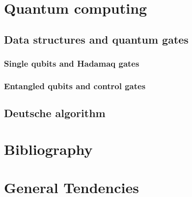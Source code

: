 \documentclass{book}
\begin{document}
\chapter{Quantum computing}
\section{Data structures and quantum gates}
\subsection{Single qubits and Hadamaq gates}
\subsection{Entangled qubits and control gates}
\section{Deutsche algorithm}
\chapter{Bibliography}
\chapter{General Tendencies}

\backmatter
{}
\printindex
\end{document}
